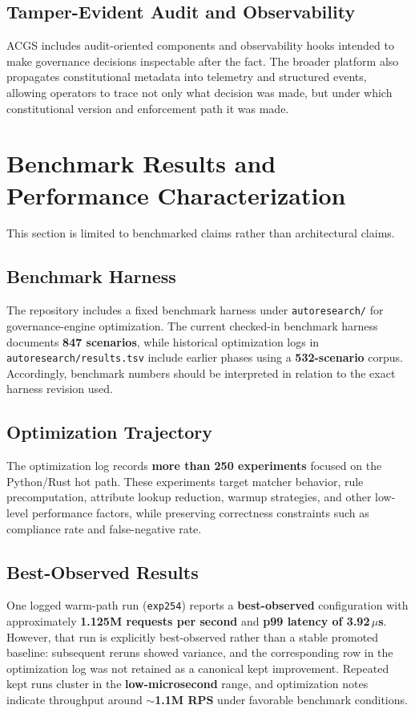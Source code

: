 \documentclass[11pt]{article}
\begin{document}
\subsection{Tamper-Evident Audit and Observability}
ACGS includes audit-oriented components and observability hooks intended to make governance decisions inspectable after the fact. The broader platform also propagates constitutional metadata into telemetry and structured events, allowing operators to trace not only what decision was made, but under which constitutional version and enforcement path it was made.

\section{Benchmark Results and Performance Characterization}
This section is limited to benchmarked claims rather than architectural claims.

\subsection{Benchmark Harness}
The repository includes a fixed benchmark harness under \texttt{autoresearch/} for governance-engine optimization. The current checked-in benchmark harness documents \textbf{847 scenarios}, while historical optimization logs in \texttt{autoresearch/results.tsv} include earlier phases using a \textbf{532-scenario} corpus. Accordingly, benchmark numbers should be interpreted in relation to the exact harness revision used.

\subsection{Optimization Trajectory}
The optimization log records \textbf{more than 250 experiments} focused on the Python/Rust hot path. These experiments target matcher behavior, rule precomputation, attribute lookup reduction, warmup strategies, and other low-level performance factors, while preserving correctness constraints such as compliance rate and false-negative rate.

\subsection{Best-Observed Results}
One logged warm-path run (\texttt{exp254}) reports a \textbf{best-observed} configuration with approximately \textbf{1.125M requests per second} and \textbf{p99 latency of 3.92\,$\mu$s}. However, that run is explicitly best-observed rather than a stable promoted baseline: subsequent reruns showed variance, and the corresponding row in the optimization log was not retained as a canonical kept improvement. Repeated kept runs cluster in the \textbf{low-microsecond} range, and optimization notes indicate throughput around \textbf{$\sim$1.1M RPS} under favorable benchmark conditions.
\end{document}
